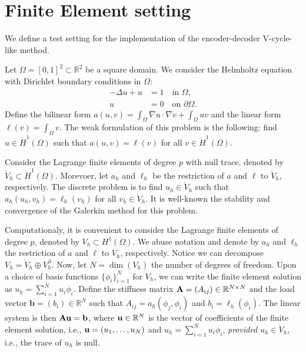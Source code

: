 \section{Finite Element setting}
\label{sec:fem}

We define a test setting for the implementation of the encoder-decoder V-cycle-like method.

Let $\Omega = [0,1]^2 \subset \mathbb{R}^2$ be a square domain.
We consider the Helmholtz equation with Dirichlet boundary conditions in $\Omega$:
\begin{subequations}
    \begin{align}
        -\Delta u + u &= 1 \quad \text{in } \Omega, \\
        u &= 0 \quad \text{on } \partial \Omega.
    \end{align}
\end{subequations}
Define the bilinear form \(a(u,v) = \int_{\Omega} \nabla u \cdot \nabla v + \int_{\Omega} uv\) and the linear form \(\ell(v) = \int_{\Omega} v\).
The weak formulation of this problem is the following:
find \(u \in \mathring{H}^1(\Omega)\) such that \(a(u,v) = \ell(v)\) for all \(v \in \mathring{H}^1(\Omega)\).

Consider the Lagrange finite elements of degree \(p\) with null trace, denoted by \(\mathring{V}_h \subset \mathring{H}^1(\Omega)\).
Morevoer, let \(a_h\) and \(\ell_h\) be the restriction of \(a\) and \(\ell\) to \(\mathring{V}_h\), respectively.
The discrete problem is to find \(u_h \in \mathring{V}_h\) such that \(a_h(u_h,v_h) = \ell_h(v_h)\) for all \(v_h \in \mathring{V}_h\).
It is well-known the stability and convergence of the Galerkin method for this problem.

Computationaly, it is convenient to consider the Lagrange finite elements of degree \(p\), denoted by \(V_h \subset H^1(\Omega)\).
We abuse notation and denote by \(a_h\) and \(\ell_h\) the restriction of \(a\) and \(\ell\) to \(V_h\), respectively.
Notice we can decompose \(V_h = \mathring{V}_h \oplus V_h^\partial\).
Now, let \( N = \dim(V_h) \) the number of degrees of freedom.
Upon a choice of basis functions \( \{ \phi_i \}_{i=1}^{N} \) for \(V_h\), we can write the finite element solution as \(u_h = \sum_{i=1}^{N} u_i \phi_i\).
Define the stiffness matrix \(\mathbf{A} = (A_{ij}) \in \mathbb{R}^{N \times N}\) and the load vector \(\mathbf{b} = (b_i) \in \mathbb{R}^{N}\) such that \(A_{ij} = a_h(\phi_j, \phi_i)\) and \(b_i = \ell_h(\phi_i)\).
The linear system is then \(\mathbf{A} \mathbf{u} = \mathbf{b}\), where \(\mathbf{u} \in \mathbb{R}^{N}\) is the vector of coefficients of the finite element solution, i.e., \(\mathbf{u} = (u_1, \ldots, u_N)\) and \(u_h = \sum_{i=1}^{N} u_i \phi_i\), \emph{provided} \(u_h \in \mathring{V}_h\), i.e., the trace of \(u_h\) is null.

